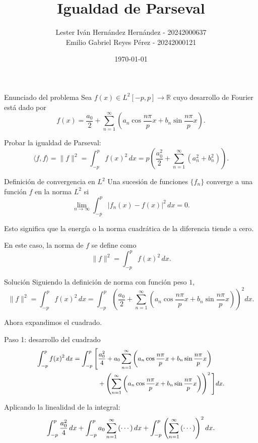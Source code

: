 \documentclass[10pt]{beamer}
\title[Igualdad de Parseval]{\fontsize{18}{20}\selectfont Igualdad de Parseval}
\author[\fontsize{5}{6}\selectfont Lester Hernández \and Emilio Reyes]{\fontsize{11}{13}\selectfont Lester Iván Hernández Hernández - 20242000637 \\ Emilio Gabriel Reyes Pérez - 20242000121}
\institute[MM-415]{\fontsize{12}{14}\selectfont Ecuaciones Diferenciales Parciales (MM-415)}
\date[\today]{\fontsize{10}{12}\selectfont \today}
\begin{document}
\begin{frame}[plain]
  \maketitle
\end{frame}

\begin{frame}{Enunciado del problema}
Sea $f(x) \in L^2[-p,p] \longrightarrow \mathbb{R}$ cuyo desarrollo de Fourier está dado por
\[
  f(x) = \frac{a_0}{2} + \sum_{n=1}^{\infty} \left(a_n \cos\frac{n\pi}{p}x + b_n \sin\frac{n\pi}{p}x\right).
\]

Probar la igualdad de Parseval:
\[
  \langle f,f\rangle = \|f\|^2 = \int_{-p}^{p} f(x)^2\,dx
  = p\left(\frac{a_0^2}{2} + \sum_{n=1}^{\infty}(a_n^2+b_n^2)\right).
\]
\end{frame}

\begin{frame}{Definición de convergencia en $L^2$}
Una sucesión de funciones $\{f_n\}$ converge a una función $f$ en la norma $L^2$ si
\[
  \lim_{n\to\infty} \int_{-p}^{p} |f_n(x)-f(x)|^2\,dx = 0.
\]

Esto significa que la energía o la norma cuadrática de la diferencia tiende a cero.

En este caso, la norma de $f$ se define como
\[
  \|f\|^2 = \int_{-p}^{p} f(x)^2\,dx.
\]
\end{frame}

\begin{frame}{Solución}
Siguiendo la definición de norma con función peso $1$,
\[
  \|f\|^2 = \int_{-p}^{p} f(x)^2\,dx
  = \int_{-p}^{p} \left(\frac{a_0}{2} + \sum_{n=1}^{\infty}\left(a_n\cos\frac{n\pi}{p}x + b_n\sin\frac{n\pi}{p}x\right)\right)^2 dx.
\]

Ahora expandimos el cuadrado.
\end{frame}

\begin{frame}{Paso 1: desarrollo del cuadrado}
\[
\small
\begin{aligned}
\int_{-p}^{p} f(x)^2\,dx
= \int_{-p}^{p} \Bigg[ &\frac{a_0^2}{4}
+ a_0\sum_{n=1}^{\infty}\left(a_n\cos\frac{n\pi}{p}x+b_n\sin\frac{n\pi}{p}x\right) \\
&+ \left(\sum_{n=1}^{\infty}\left(a_n\cos\frac{n\pi}{p}x+b_n\sin\frac{n\pi}{p}x\right)\right)^2 \Bigg] dx.
\end{aligned}
\]

Aplicando la linealidad de la integral:
\[
\small
\int_{-p}^{p} \frac{a_0^2}{4}\,dx
+ \int_{-p}^{p} a_0\sum_{n=1}^{\infty}\left(\cdots\right)dx
+ \int_{-p}^{p}\left(\sum_{n=1}^{\infty}\left(\cdots\right)\right)^2 dx.
\]
\end{frame}
\end{document}
